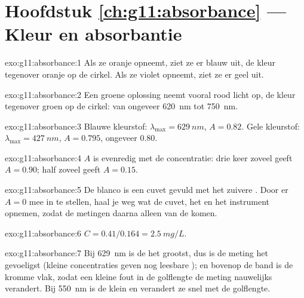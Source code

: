 \section*{Hoofdstuk \ref{ch:g11:absorbance} --- Kleur en absorbantie}

\begin{solution}{exo:g11:absorbance:1}
Als ze oranje opneemt, ziet ze er blauw uit, de kleur tegenover oranje op
de cirkel. Als ze violet opneemt, ziet ze er geel uit.
\end{solution}

\begin{solution}{exo:g11:absorbance:2}
Een groene oplossing neemt vooral rood licht op, de kleur tegenover groen
op de cirkel: van ongeveer \qty{620}{nm} tot \qty{750}{nm}.
\end{solution}

\begin{solution}{exo:g11:absorbance:3}
Blauwe kleurstof: $\lambda_{\max} = \qty{629}{nm}$, $A = 0.82$. Gele
kleurstof: $\lambda_{\max} = \qty{427}{nm}$, $A = 0.795$, ongeveer 0.80.
\end{solution}

\begin{solution}{exo:g11:absorbance:4}
$A$ is evenredig met de concentratie: drie keer zoveel geeft
$A = 0.90$; half zoveel geeft $A = 0.15$.
\end{solution}

\begin{solution}{exo:g11:absorbance:5}
De blanco is een cuvet gevuld met het zuivere . Door er
$A = 0$ mee in te stellen, haal je weg wat de cuvet, het  en
het instrument opnemen, zodat de metingen daarna alleen van de  komen.
\end{solution}

\begin{solution}{exo:g11:absorbance:6}
$C = 0.41 / 0.164 = \qty{2.5}{mg/L}$.
\end{solution}

\begin{solution}{exo:g11:absorbance:7}
Bij \qty{629}{nm} is de  het grootst, dus is de meting het
gevoeligst (kleine concentraties geven nog leesbare ); en
bovenop de band is de kromme vlak, zodat een kleine fout in de golflengte
de meting nauwelijks verandert. Bij \qty{550}{nm} is de 
klein en verandert ze snel met de golflengte.
\end{solution}

